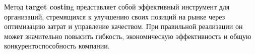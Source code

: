 Метод \textbf{target costin}g представляет собой эффективный инструмент для организаций, стремящихся к улучшению своих позиций на рынке через оптимизацию затрат и управление качеством. При правильной реализации он может значительно повысить гибкость, экономическую эффективность и общую конкурентоспособность компании.
